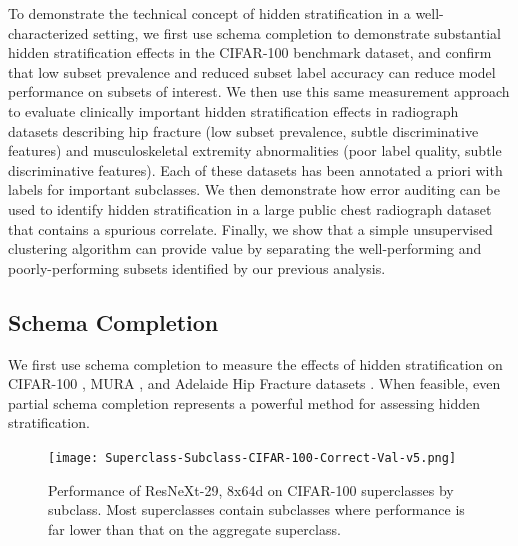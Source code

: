 \documentclass{article}
\begin{document}
To demonstrate the technical concept of hidden stratification in a well-characterized setting, we first use schema completion to demonstrate substantial hidden stratification effects in the CIFAR-100 benchmark dataset, and confirm that low subset prevalence and reduced subset label accuracy can reduce model performance on subsets of interest.
We then use this same measurement approach to evaluate clinically important hidden stratification effects in radiograph datasets describing hip fracture (low subset prevalence, subtle discriminative features) and musculoskeletal extremity abnormalities (poor label quality, subtle discriminative features).
Each of these datasets has been annotated a priori with labels for important subclasses.
We then demonstrate how error auditing can be used to identify hidden stratification in a large public chest radiograph dataset that contains a spurious correlate.
Finally, we show that a simple unsupervised clustering algorithm can provide value by separating the well-performing and poorly-performing subsets identified by our previous analysis.

\subsection{Schema Completion}

We first use schema completion to measure the effects of hidden stratification on CIFAR-100 \citep{Krizhevsky2009-tq}, MURA \citep{Rajpurkar2017-rc}, and Adelaide Hip Fracture datasets \citep{Gale_W_Oakden-Rayner_L_Carneiro_G_Bradley_AP_Palmer_LJ2017-tl}.
When feasible, even partial schema completion represents a powerful method for assessing hidden stratification.

 \begin{figure}[htb!]
 \centering
\texttt{[image: Superclass-Subclass-CIFAR-100-Correct-Val-v5.png]}
\caption{Performance of ResNeXt-29, 8x64d on CIFAR-100 superclasses by subclass.  Most superclasses contain subclasses where performance is far lower than that on the aggregate superclass.}
\label{fig:cifar}
\vspace{-2mm}
\end{figure}
\end{document}
